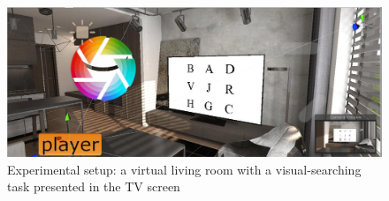\documentclass[sigconf]{acmart}
\begin{document}
\begin{figure}[h]
      \centering
      \includegraphics[width=\linewidth]{aaafiles/environments_b}
      \caption{Experimental setup: a virtual living room with a visual-searching task  presented in the TV screen }
      \label{fig:environments_b}
\end{figure}





\end{document}
